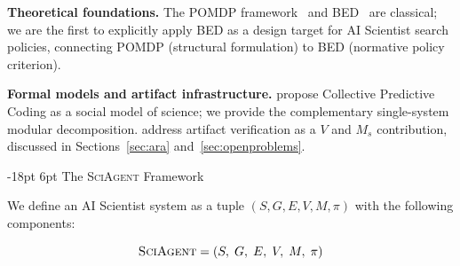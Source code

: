 \documentclass[11pt]{article}
\makeatletter
\renewcommand\section{\@startsection{section}{1}{\z@}%
  {-18pt \@plus -4pt \@minus -2pt}%
  {6pt \@plus 2pt}%
  {\normalfont\large\bfseries}}
\newcommand{\sgmvpi}{$(S, G, E, V, M, \pi)$}
\newcommand{\framework}{\textsc{SciAgent}}
\makeatother
\begin{document}
\textbf{Theoretical foundations.} The POMDP framework~\citep{kaelbling1998pomdp} and BED~\citep{chaloner1995bayesian,rainforth2024modern} are classical; we are the first to explicitly apply BED as a design target for AI Scientist search policies, connecting POMDP (structural formulation) to BED (normative policy criterion).

\textbf{Formal models and artifact infrastructure.} \citet{taniguchi2024cpc} propose Collective Predictive Coding as a social model of science; we provide the complementary single-system modular decomposition. \citet{liu2026lasthuman} address artifact verification as a $V$ and $M_s$ contribution, discussed in Sections~\ref{sec:ara} and~\ref{sec:openproblems}.

\section{The \framework{} Framework}
\label{sec:framework}

We define an AI Scientist system as a tuple \sgmvpi{} with the following components:

\begin{equation}
  \text{\framework{}} = (S,\; G,\; E,\; V,\; M,\; \pi)
\end{equation}
\end{document}
